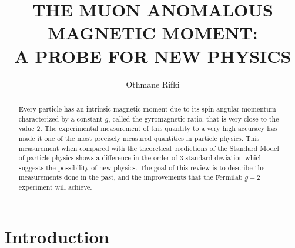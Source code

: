 \documentclass{outhesis}
\begin{document}
\author{Othmane Rifki}
\title{THE MUON ANOMALOUS MAGNETIC MOMENT:\\ A PROBE FOR NEW PHYSICS}
\address{Norman, Oklahoma}


%  


\begin{abstract}
Every particle has an intrinsic magnetic moment due to its spin angular momentum characterized by a constant $g$, called the gyromagnetic ratio, that is very close to the value 2. The experimental measurement of this quantity to a very high accuracy has made it one of the most precisely measured quantities in particle physics. This measurement when compared with the theoretical predictions of the Standard Model of particle physics shows a difference in the order of 3 standard deviation which suggests the possibility of new physics. The goal of this review is to describe the measurements done in the past, and the improvements that the Fermilab $g-2$ experiment will achieve.

\end{abstract}


\frontmatter

\maketitle

\mainmatter



\section{Introduction}
\end{document}
